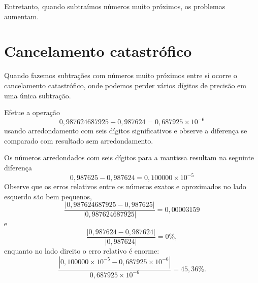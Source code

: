 \documentclass[main.tex]{subfiles}
\begin{document}
Entretanto, quando subtraímos números muito próximos, os problemas aumentam.

\section{Cancelamento catastrófico}

Quando fazemos subtrações com números muito próximos entre si ocorre o cancelamento catastrófico, onde podemos perder vários dígitos de precisão em uma única subtração.

\begin{ex}Efetue a operação
  \begin{equation*}
    0,987624687925-0,987624=0,687925\times 10^{-6}    
  \end{equation*}
usando arredondamento com seis dígitos significativos e observe a diferença se comparado com resultado sem arredondamento.
\end{ex}
\begin{sol}
Os números arredondados com seis dígitos para a mantissa resultam na seguinte diferença
$$
0,987625-0,987624=0,100000\times 10^{-5}
$$
Observe que os erros relativos entre os números exatos e aproximados no lado esquerdo são bem pequenos,
\begin{equation*}
  \frac{|0,987624687925-0,987625|}{|0,987624687925|}=0,00003159  
\end{equation*}
e
\begin{equation*}
  \frac{|0,987624-0,987624|}{|0,987624|}=0\%,
\end{equation*}
enquanto no lado direito o erro relativo é enorme:
\begin{equation*}
\frac{|0,100000\times 10^{-5}-0,687925\times 10^{-6}|}{0,687925\times 10^{-6}}=45,36\%.  
\end{equation*}
\end{sol}
\end{document}
